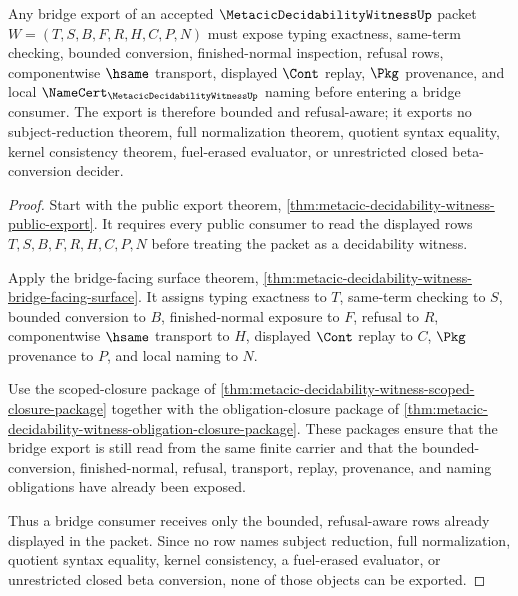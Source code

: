 \begin{theorem}
\label{thm:metacic-decidability-witness-bridge-export}
Any bridge export of an accepted $\MetacicDecidabilityWitnessUp$ packet $W=(T,S,B,F,R,H,C,P,N)$ must expose typing exactness, same-term checking, bounded conversion, finished-normal inspection, refusal rows, componentwise $\hsame$ transport, displayed $\Cont$ replay, $\Pkg$ provenance, and local $\NameCert_{\MetacicDecidabilityWitnessUp}$ naming before entering a bridge consumer. The export is therefore bounded and refusal-aware; it exports no subject-reduction theorem, full normalization theorem, quotient syntax equality, kernel consistency theorem, fuel-erased evaluator, or unrestricted closed beta-conversion decider.
\end{theorem}
\begin{proof}
Start with the public export theorem, \autoref{thm:metacic-decidability-witness-public-export}. It requires every public consumer to read the displayed rows $T,S,B,F,R,H,C,P,N$ before treating the packet as a decidability witness.

Apply the bridge-facing surface theorem, \autoref{thm:metacic-decidability-witness-bridge-facing-surface}. It assigns typing exactness to $T$, same-term checking to $S$, bounded conversion to $B$, finished-normal exposure to $F$, refusal to $R$, componentwise $\hsame$ transport to $H$, displayed $\Cont$ replay to $C$, $\Pkg$ provenance to $P$, and local naming to $N$.

Use the scoped-closure package of \autoref{thm:metacic-decidability-witness-scoped-closure-package} together with the obligation-closure package of \autoref{thm:metacic-decidability-witness-obligation-closure-package}. These packages ensure that the bridge export is still read from the same finite carrier and that the bounded-conversion, finished-normal, refusal, transport, replay, provenance, and naming obligations have already been exposed.

Thus a bridge consumer receives only the bounded, refusal-aware rows already displayed in the packet. Since no row names subject reduction, full normalization, quotient syntax equality, kernel consistency, a fuel-erased evaluator, or unrestricted closed beta conversion, none of those objects can be exported.
\end{proof}

